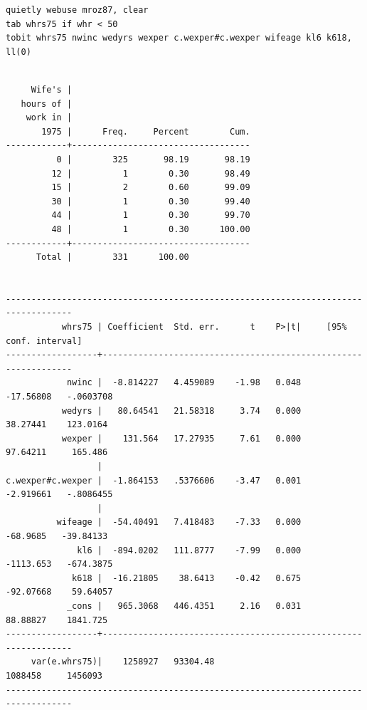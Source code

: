 \begin{tcolorbox}[title=在 Stata 中估计 Poisson 模型和负二项模型, colback=white, colframe=black, colbacktitle=white, coltitle=black,fonttitle=\bfseries]
\begin{Verbatim}[commandchars=\\\{\},xleftmargin=2em]
\end{Verbatim}
\end{tcolorbox}

\begin{tcolorbox}[title=在 Stata 中估计 Tobit 模型, colback=white, colframe=black, colbacktitle=white, coltitle=black,fonttitle=\bfseries]
\begin{lstlisting}[xleftmargin=2em, commentstyle=\color{black}]
quietly webuse mroz87, clear
tab whrs75 if whr < 50
tobit whrs75 nwinc wedyrs wexper c.wexper#c.wexper wifeage kl6 k618, ll(0)
\end{lstlisting}
\vspace{-2em}
\begin{Verbatim}[commandchars=\\\{\},xleftmargin=2em]

     Wife's |
   hours of |
    work in |
       1975 |      Freq.     Percent        Cum.
------------+-----------------------------------
          0 |        325       98.19       98.19
         12 |          1        0.30       98.49
         15 |          2        0.60       99.09
         30 |          1        0.30       99.40
         44 |          1        0.30       99.70
         48 |          1        0.30      100.00
------------+-----------------------------------
      Total |        331      100.00


-----------------------------------------------------------------------------------
           whrs75 | Coefficient  Std. err.      t    P>|t|     [95% conf. interval]
------------------+----------------------------------------------------------------
            nwinc |  -8.814227   4.459089    -1.98   0.048    -17.56808   -.0603708
           wedyrs |   80.64541   21.58318     3.74   0.000     38.27441    123.0164
           wexper |    131.564   17.27935     7.61   0.000     97.64211     165.486
                  |
c.wexper#c.wexper |  -1.864153   .5376606    -3.47   0.001    -2.919661   -.8086455
                  |
          wifeage |  -54.40491   7.418483    -7.33   0.000     -68.9685   -39.84133
              kl6 |  -894.0202   111.8777    -7.99   0.000    -1113.653   -674.3875
             k618 |  -16.21805    38.6413    -0.42   0.675    -92.07668    59.64057
            _cons |   965.3068   446.4351     2.16   0.031     88.88827    1841.725
------------------+----------------------------------------------------------------
     var(e.whrs75)|    1258927   93304.48                       1088458     1456093
-----------------------------------------------------------------------------------

\end{Verbatim}
\end{tcolorbox}

